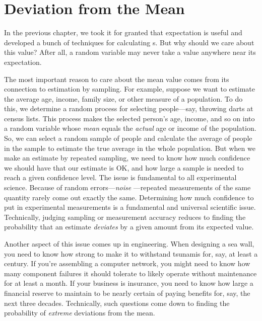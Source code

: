 \chapter{Deviation from the Mean}\label{deviation_chap}


In the previous chapter, we took it for granted that expectation is
useful and developed a bunch of techniques for calculating
s.  But why should we care about this value?
After all, a random variable may never take a value anywhere near its
expectation.

The most important reason to care about the mean value comes from its
connection to estimation by sampling.  For example, suppose we want to
estimate the average age, income, family size, or other measure of a
population.  To do this, we determine a random process for selecting
people---say, throwing darts at census lists.  This process makes the
selected person's age, income, and so on into a random variable whose
\emph{mean} equals the \emph{actual } age or income of
the population.  So, we can select a random sample of people and
calculate the average of people in the sample to estimate the true
average in the whole population.  But when we make an estimate by
repeated sampling, we need to know how much confidence we should have
that our estimate is OK, and how large a sample is needed to reach a
given confidence level.  The issue is fundamental to all
experimental science.  Because of random errors---\emph{noise}
---repeated measurements of the same quantity rarely come out exactly
the same.  Determining how much confidence to put in experimental
measurements is a fundamental and universal scientific issue.  
Technically, judging sampling or measurement accuracy reduces to
finding the probability that an estimate \emph{deviates} by a given
amount from its expected value.

Another aspect of this issue comes up in engineering.  When designing
a sea wall, you need to know how strong to make it to withstand
tsunamis for, say, at least a century.  If you're assembling a
computer network, you might need to know how many component failures it
should tolerate to likely operate without maintenance for at
least a month.  If your business is insurance, you need to know how
large a financial reserve to maintain to be nearly certain of paying
benefits for, say, the next three decades.  Technically, such
questions come down to finding the probability of \emph{extreme}
deviations from the mean.

